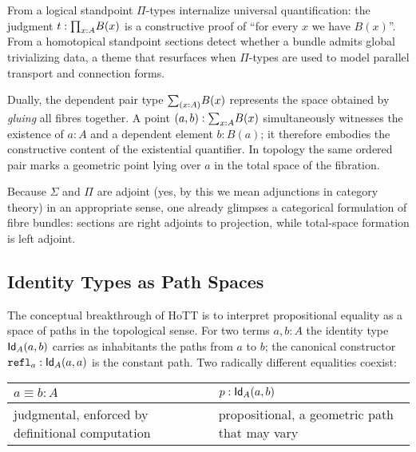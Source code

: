 From a logical standpoint \(\Pi\)-types internalize universal
quantification: the judgment \(t:\textstyle\mathbf{\prod}_{x:A}B(x)\) is a constructive
proof of ``for every \(x\) we have \(B(x)\)''.  From a homotopical
standpoint sections detect whether a bundle admits global trivializing
data, a theme that resurfaces when \(\Pi\)-types are used to model
parallel transport and connection forms.

\begin{definition}\label{def:dep-pair-type}
    Dually, the dependent pair type \(\textstyle\mathbf{\sum}_{(x:A)}B(x)\) represents the
    space obtained by \emph{gluing} all fibres together.  A point
    \((a,b):\textstyle\mathbf{\sum}_{x:A}B(x)\) simultaneously witnesses the existence of
    \(a:A\) and a dependent element \(b:B(a)\); it therefore embodies the
    constructive content of the existential quantifier.  In topology the
    same ordered pair marks a geometric point lying over \(a\) in the
    total space of the fibration.
\end{definition}

Because \(\Sigma\) and \(\Pi\) are adjoint
(yes, by this we mean adjunctions in category theory)
in an appropriate sense,
one already glimpses a categorical formulation of fibre bundles:
sections are right adjoints to projection, while total-space formation
is left adjoint.

\subsection{Identity Types as Path Spaces}
The conceptual breakthrough of HoTT is to interpret propositional equality as a space of paths in the topological sense.
For two terms \(a,b:A\) the identity type \(\textsf{Id}_{A}(a,b)\) carries as inhabitants the paths from \(a\) to \(b\);
the canonical constructor \(\texttt{refl}_{a}:\textsf{Id}_{A}(a,a)\) is the constant path.  
Two radically different equalities coexist:

\begin{table}[htbp]
    \begin{tabularx}
        {\textwidth}
        {>{\raggedright\arraybackslash}p{}>{\raggedright\arraybackslash}p{}}
        \toprule
        \(\displaystyle a\equiv b:A\)                    & \(\displaystyle p:\textsf{Id}_{A}(a,b)\) \\
        \midrule
        judgmental, enforced by definitional computation &
        propositional, a geometric path that may vary                                       \\
        \bottomrule
    \end{tabularx}
\end{table}

